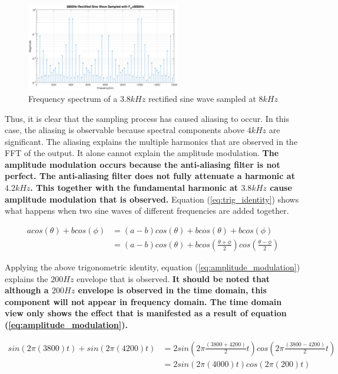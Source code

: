 \documentclass{article}
\begin{document}
\begin{figure}[H]
    \centering
    \includegraphics[width=0.6\textwidth]{3800Hz_rectified_sine_wave}
    \caption{Frequency spectrum of a $3.8kHz$ rectified sine wave sampled at $8kHz$}
    \label{fig:fully_rectified_sine_wave_spectrum_sampled}
\end{figure}


Thus, it is clear that the sampling process has caused aliasing to occur. In this case, the aliasing is observable because spectral components above $4kHz$ are significant. The aliasing explains the multiple harmonics that are observed in the FFT of the output. It alone cannot explain the amplitude modulation. \textbf{The amplitude modulation occurs because the anti-aliasing filter is not perfect. The anti-aliasing filter does not fully attenuate a harmonic at $4.2kHz$. This together with the fundamental harmonic at $3.8kHz$ cause amplitude modulation that is observed.} Equation (\ref{eq:trig_identity}) shows what happens when two sine waves of different frequencies are added together. 

\begin{align}
    acos(\theta) + bcos(\phi)   &= (a-b)cos(\theta) + bcos(\theta) + bcos(\phi)\\
                                &= (a-b)cos(\theta) + bcos(\frac{\theta + \phi}{2})cos(\frac{\theta-\phi}{2})\label{eq:trig_identity}
\end{align}

Applying the above trigonometric identity, equation (\ref{eq:amplitude_modulation}) explains the $200Hz$ envelope that is observed. \textbf{It should be noted that although a $200Hz$ envelope is observed in the time domain, this component will not appear in frequency domain. The time domain view only shows the effect that is manifested as a result of equation (\ref{eq:amplitude_modulation}).}

\begin{align}
    sin(2\pi (3800)t)+sin(2\pi (4200)t) &= 2sin(2\pi \frac{(3800+4200)}{2}t)cos(2\pi \frac{(3800-4200)}{2}t)\\
                                        &= 2sin(2\pi (4000)t)cos(2\pi (200)t)\label{eq:amplitude_modulation}
\end{align}
\end{document}
